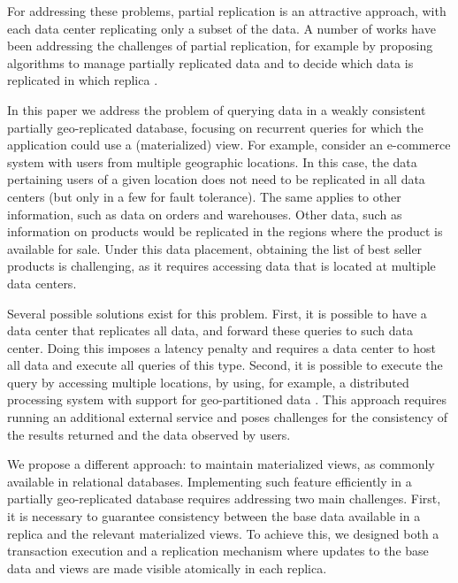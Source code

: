 \documentclass[sigplan,10pt]{acmart}
\begin{document}
For addressing these problems, partial replication is an attractive approach, with each data center
replicating only a subset of the data.
A number of works have been addressing the challenges of 
partial replication, for example by proposing algorithms to manage partially replicated data \cite{spanner,saturn,sipre, practi} and to decide which data is replicated in which replica \cite{slog, sipre}.

In this paper we address the problem of querying data in a weakly consistent partially geo-replicated database, 
focusing on recurrent queries for which the application could use a (materialized) view.
For example, consider an e-commerce system with users from multiple geographic locations.
In this case, the data pertaining users of a given location does not need to be replicated in all data centers
(but only in a few for fault tolerance). The same applies to other information, such as data on orders and 
warehouses.
Other data, such as information on products would be replicated in the regions where the product
is available for sale.  
Under this data placement, obtaining the list of best seller products is challenging, as it requires
accessing data that is located at multiple data centers.

Several possible solutions exist for this problem. 
First, it is possible to have a data center that replicates all data, and forward these queries to such data center.
Doing this imposes a latency penalty and requires a data center to host all data and execute all queries of this type. %
Second, it is possible to execute the query by accessing multiple locations, by using, for example, 
a distributed processing system with support for geo-partitioned data \cite{kloudas2015pixida,jetstream}.
This approach requires running an additional external service and poses challenges for the consistency of the results returned and the data observed by users.

We propose a different approach: to maintain materialized views, as commonly available in relational databases.
Implementing such feature efficiently in a partially geo-replicated database requires 
addressing two main challenges. 
First, it is necessary to guarantee consistency between the base data available in a replica and the 
relevant materialized views. To achieve this, we designed both a transaction execution and a replication mechanism where updates 
to the base data and views are made visible atomically in each replica.
\end{document}
